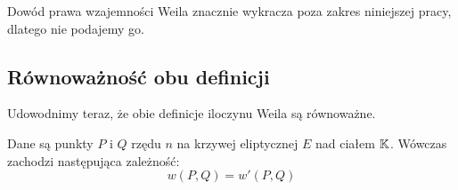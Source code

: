 \noindent
Dowód prawa wzajemności Weila znacznie wykracza
poza zakres niniejszej pracy, dlatego nie podajemy go.

\subsection*{Równoważność obu definicji}

\noindent
Udowodnimy teraz, że obie definicje iloczynu Weila są równoważne.

\begin{theorem}
Dane są punkty $P$ i $Q$ rzędu $n$ na krzywej eliptycznej $E$ nad ciałem $\mathbb{K}$.
Wówczas zachodzi następująca zależność:
\begin{equation}
w(P, Q) = w'(P, Q)
\end{equation}
\end{theorem}

